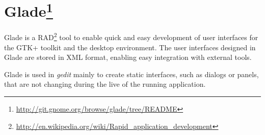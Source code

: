 
\section[Glade]{Glade\footnote{\url{http://git.gnome.org/browse/glade/tree/README}}}\label{sec:Glade}

Glade is a RAD\footnote{\url{http://en.wikipedia.org/wiki/Rapid_application_development}} tool to enable quick and easy development of user interfaces for the GTK+ toolkit and the \GNOME desktop environment. The user interfaces designed in Glade are stored in XML format, enabling easy integration with external tools.

Glade is used in \emph{gedit} mainly to create static interfaces, such as dialogs or panels, that are not changing during the live of the running application.
